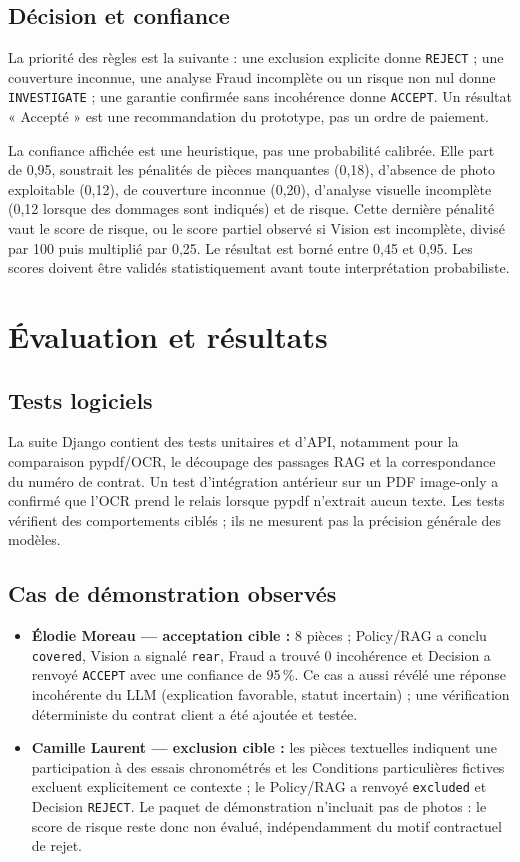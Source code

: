 \documentclass[10pt,a4paper]{article}
\newcommand{\code}[1]{\texttt{\small #1}}
\newcommand{\strong}[1]{\textbf{#1}}
\begin{document}
\subsection*{Décision et confiance}
La priorité des règles est la suivante : une exclusion explicite donne \code{REJECT} ; une couverture inconnue, une analyse Fraud incomplète ou un risque non nul donne \code{INVESTIGATE} ; une garantie confirmée sans incohérence donne \code{ACCEPT}. Un résultat « Accepté » est une recommandation du prototype, pas un ordre de paiement.

La confiance affichée est une heuristique, pas une probabilité calibrée. Elle part de 0,95, soustrait les pénalités de pièces manquantes (0,18), d’absence de photo exploitable (0,12), de couverture inconnue (0,20), d’analyse visuelle incomplète (0,12 lorsque des dommages sont indiqués) et de risque. Cette dernière pénalité vaut le score de risque, ou le score partiel observé si Vision est incomplète, divisé par 100 puis multiplié par 0,25. Le résultat est borné entre 0,45 et 0,95. Les scores doivent être validés statistiquement avant toute interprétation probabiliste.

\newpage
\section{Évaluation et résultats}
\subsection*{Tests logiciels}
La suite Django contient des tests unitaires et d’API, notamment pour la comparaison pypdf/OCR, le découpage des passages RAG et la correspondance du numéro de contrat. Un test d’intégration antérieur sur un PDF image-only a confirmé que l’OCR prend le relais lorsque pypdf n’extrait aucun texte. Les tests vérifient des comportements ciblés ; ils ne mesurent pas la précision générale des modèles.

\subsection*{Cas de démonstration observés}
\begin{itemize}
\item \strong{Élodie Moreau — acceptation cible :} 8 pièces ; Policy/RAG a conclu \code{covered}, Vision a signalé \code{rear}, Fraud a trouvé 0 incohérence et Decision a renvoyé \code{ACCEPT} avec une confiance de 95\,\%. Ce cas a aussi révélé une réponse incohérente du LLM (explication favorable, statut incertain) ; une vérification déterministe du contrat client a été ajoutée et testée.
\item \strong{Camille Laurent — exclusion cible :} les pièces textuelles indiquent une participation à des essais chronométrés et les Conditions particulières fictives excluent explicitement ce contexte ; le Policy/RAG a renvoyé \code{excluded} et Decision \code{REJECT}. Le paquet de démonstration n’incluait pas de photos : le score de risque reste donc non évalué, indépendamment du motif contractuel de rejet.
\end{itemize}
\end{document}
